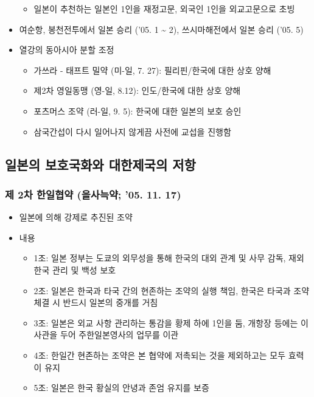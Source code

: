 \begin{itemize}
    \begin{itemize}
        \item 일본이 추천하는 일본인 1인을 재정고문, 외국인 1인을 외교고문으로 초빙
    \end{itemize}
    \item 여순항, 봉천전투에서 일본 승리 ('05. 1 \textasciitilde{} 2), 쓰시마해전에서 일본 승리 ('05. 5)
    \newpage
    \item 열강의 동아시아 분할 조정
    \begin{itemize}
        \item 가쓰라 - 태프트 밀약 (미-일, 7. 27): 필리핀/한국에 대한 상호 양해
        \item 제2차 영일동맹 (영-일, 8.12): 인도/한국에 대한 상호 양해
        \item 포츠머스 조약 (러-일, 9. 5): 한국에 대한 일본의 보호 승인
        \item 삼국간섭이 다시 일어나지 않게끔 사전에 교섭을 진행함
    \end{itemize}
\end{itemize}

\subsection{일본의 보호국화와 대한제국의 저항}

\subsubsection*{제 2차 한일협약 (을사늑약; '05. 11. 17)}

\begin{itemize}
    \item 일본에 의해 강제로 추진된 조약
    \item 내용
    \begin{itemize}
        \item 1조: 일본 정부는 도쿄의 외무성을 통해 한국의 대외 관계 및 사무 감독, 재외 한국 관리 및 백성 보호
        \item 2조: 일본은 한국과 타국 간의 현존하는 조약의 실행 책임, 한국은 타국과 조약 체결 시 반드시 일본의 중개를 거침
        \item 3조: 일본은 외교 사항 관리하는 통감을 황제 하에 1인을 둠, 개항장 등에는 이사관을 두어 주한일본영사의 업무를 이관
        \item 4조: 한일간 현존하는 조약은 본 협약에 저촉되는 것을 제외하고는 모두 효력이 유지
        \item 5조: 일본은 한국 황실의 안녕과 존엄 유지를 보증
    \end{itemize}
\end{itemize}

